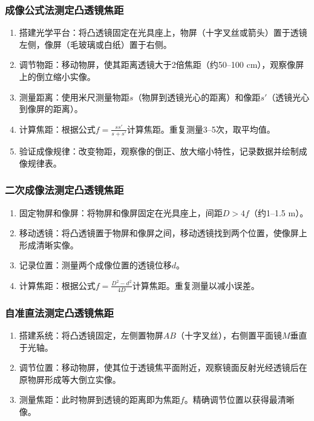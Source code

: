 \documentclass[11pt]{article}
\begin{document}
\subsubsection{成像公式法测定凸透镜焦距}
\begin{enumerate}
    \item 搭建光学平台：将凸透镜固定在光具座上，物屏（十字叉丝或箭头）置于透镜左侧，像屏（毛玻璃或白纸）置于右侧。
    \item 调节物距：移动物屏，使其距离透镜大于2倍焦距（约50--100 cm），观察像屏上的倒立缩小实像。
    \item 测量距离：使用米尺测量物距$s$（物屏到透镜光心的距离）和像距$s'$（透镜光心到像屏的距离）。
    \item 计算焦距：根据公式$f = \frac{ss'}{s + s'}$计算焦距。重复测量3--5次，取平均值。
    \item 验证成像规律：改变物距，观察像的倒正、放大缩小特性，记录数据并绘制成像规律表。
\end{enumerate}

\subsubsection{二次成像法测定凸透镜焦距}
\begin{enumerate}
    \item 固定物屏和像屏：将物屏和像屏固定在光具座上，间距$D > 4f$（约1--1.5 m）。
    \item 移动透镜：将凸透镜置于物屏和像屏之间，移动透镜找到两个位置，使像屏上形成清晰实像。
    \item 记录位置：测量两个成像位置的透镜位移$d$。
    \item 计算焦距：根据公式$f = \frac{D^2 - d^2}{4D}$计算焦距。重复测量以减小误差。
\end{enumerate}

\subsubsection{自准直法测定凸透镜焦距}
\begin{enumerate}
    \item 搭建系统：将凸透镜固定，左侧置物屏$AB$（十字叉丝），右侧置平面镜$M$垂直于光轴。
    \item 调节位置：移动物屏，使其位于透镜焦平面附近，观察镜面反射光经透镜后在原物屏形成等大倒立实像。
    \item 测量焦距：此时物屏到透镜的距离即为焦距$f$。精确调节位置以获得最清晰像。
\end{enumerate}
\end{document}
